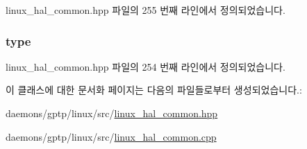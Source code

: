 linux\+\_\+hal\+\_\+common.\+hpp 파일의 255 번째 라인에서 정의되었습니다.

\subsubsection[{\texorpdfstring{type}{type}}]{ type\hspace{0.3cm}{\ttfamily [private]}}\hypertarget{class_linux_lock_aeab5ee1f363ea475ef801f98a1da7838}{}\label{class_linux_lock_aeab5ee1f363ea475ef801f98a1da7838}


linux\+\_\+hal\+\_\+common.\+hpp 파일의 254 번째 라인에서 정의되었습니다.



이 클래스에 대한 문서화 페이지는 다음의 파일들로부터 생성되었습니다.\+:\begin{DoxyCompactItemize}
\item 
daemons/gptp/linux/src/\hyperlink{linux__hal__common_8hpp}{linux\+\_\+hal\+\_\+common.\+hpp}\item 
daemons/gptp/linux/src/\hyperlink{linux__hal__common_8cpp}{linux\+\_\+hal\+\_\+common.\+cpp}\end{DoxyCompactItemize}
